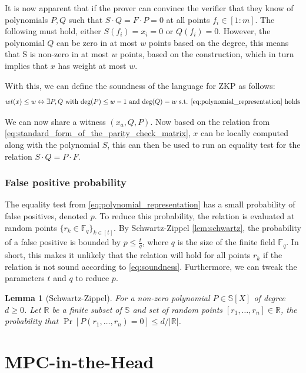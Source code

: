 \documentclass[twoside,11pt]{report}
\theoremstyle{definition}
\theoremstyle{plain}
\newtheorem{lemma}{Lemma}[section]
\begin{document}
It is now apparent that if the prover can convince the verifier that they know of polynomials $P,Q$ such that $S\cdot Q = F \cdot P = 0$ at all points $f_i \in [1:m]$. The following must hold, either $S(f_i) = x_i = 0$ or $Q(f_i) = 0$. However, the polynomial $Q$ can be zero in at most $w$ points based on the degree, this means that S is non-zero in at most $w$ points, based on the construction, which in turn implies that $x$ has weight at most $w$.

With this, we can define the soundness of the language for ZKP as follows:
\begin{equation}
  wt(x) \leq w \Leftrightarrow \exists P,Q \text{  with  }\text{deg}(P)\leq w-1\text{  and  }\text{deg}(Q) = w\text{ s.t. \autoref{eq:polynomial_representation} holds}\label{eq:soundness}
\end{equation}

We can now share a witness $(x_a, Q, P)$. Now based on the relation from \autoref{eq:standard_form_of_the_parity_check_matrix}, $x$ can be locally computed along with the polynomial $S$, this can then be used to run an equality test for the relation $S \cdot Q = P \cdot F$.

\subsubsection{False positive probability}\label{sub:equality_test}
The equality test from \autoref{eq:polynomial_representation} has a small probability of false positives, denoted $p$. To reduce this probability, the relation is evaluated at random points $\{r_k \in \mathbb{F}_q\}_{k\in[t]}$. By Schwartz-Zippel \autoref{lem:schwartz}, the probability of a false positive is bounded by $p \leq \frac{t}{q}$, where $q$ is the size of the finite field $\mathbb{F}_q$. In short, this makes it unlikely that the relation will hold for all points $r_k$ if the relation is not sound according to \autoref{eq:soundness}. Furthermore, we can tweak the parameters $t$ and $q$ to reduce $p$.

\begin{lemma}[Schwartz-Zippel]\label{lem:schwartz}
  For a non-zero polynomial $P \in \mathbb{S}[X]$ of degree $d \geq 0$. Let $\mathbb{R}$ be a finite subset of $\mathbb{S}$ and set of random points $[r_1, \dots, r_n] \in \mathbb{R}$, the probability that $\Pr[P(r_1, \dots, r_n) = 0] \leq d/|\mathbb{R}|$.
\end{lemma}

\section{MPC-in-the-Head}\label{sec:mpcinth}
\end{document}
